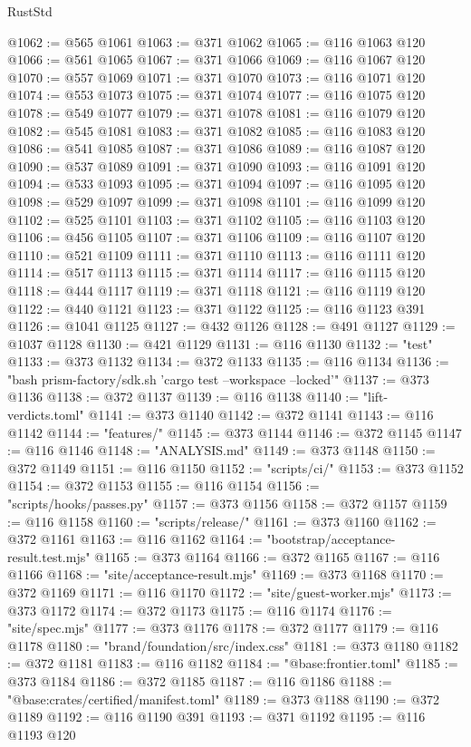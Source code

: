 \begin{lexlean}{RustStd}
\begin{coremodule}
@1062 := @565 @1061
@1063 := @371 @1062
@1065 := @116 @1063 @120
@1066 := @561 @1065
@1067 := @371 @1066
@1069 := @116 @1067 @120
@1070 := @557 @1069
@1071 := @371 @1070
@1073 := @116 @1071 @120
@1074 := @553 @1073
@1075 := @371 @1074
@1077 := @116 @1075 @120
@1078 := @549 @1077
@1079 := @371 @1078
@1081 := @116 @1079 @120
@1082 := @545 @1081
@1083 := @371 @1082
@1085 := @116 @1083 @120
@1086 := @541 @1085
@1087 := @371 @1086
@1089 := @116 @1087 @120
@1090 := @537 @1089
@1091 := @371 @1090
@1093 := @116 @1091 @120
@1094 := @533 @1093
@1095 := @371 @1094
@1097 := @116 @1095 @120
@1098 := @529 @1097
@1099 := @371 @1098
@1101 := @116 @1099 @120
@1102 := @525 @1101
@1103 := @371 @1102
@1105 := @116 @1103 @120
@1106 := @456 @1105
@1107 := @371 @1106
@1109 := @116 @1107 @120
@1110 := @521 @1109
@1111 := @371 @1110
@1113 := @116 @1111 @120
@1114 := @517 @1113
@1115 := @371 @1114
@1117 := @116 @1115 @120
@1118 := @444 @1117
@1119 := @371 @1118
@1121 := @116 @1119 @120
@1122 := @440 @1121
@1123 := @371 @1122
@1125 := @116 @1123 @391
@1126 := @1041 @1125
@1127 := @432 @1126
@1128 := @491 @1127
@1129 := @1037 @1128
@1130 := @421 @1129
@1131 := @116 @1130
@1132 := "test"
@1133 := @373 @1132
@1134 := @372 @1133
@1135 := @116 @1134
@1136 := "bash prism-factory/sdk.sh 'cargo test --workspace --locked'"
@1137 := @373 @1136
@1138 := @372 @1137
@1139 := @116 @1138
@1140 := "lift-verdicts.toml"
@1141 := @373 @1140
@1142 := @372 @1141
@1143 := @116 @1142
@1144 := "features/"
@1145 := @373 @1144
@1146 := @372 @1145
@1147 := @116 @1146
@1148 := "ANALYSIS.md"
@1149 := @373 @1148
@1150 := @372 @1149
@1151 := @116 @1150
@1152 := "scripts/ci/"
@1153 := @373 @1152
@1154 := @372 @1153
@1155 := @116 @1154
@1156 := "scripts/hooks/passes.py"
@1157 := @373 @1156
@1158 := @372 @1157
@1159 := @116 @1158
@1160 := "scripts/release/"
@1161 := @373 @1160
@1162 := @372 @1161
@1163 := @116 @1162
@1164 := "bootstrap/acceptance-result.test.mjs"
@1165 := @373 @1164
@1166 := @372 @1165
@1167 := @116 @1166
@1168 := "site/acceptance-result.mjs"
@1169 := @373 @1168
@1170 := @372 @1169
@1171 := @116 @1170
@1172 := "site/guest-worker.mjs"
@1173 := @373 @1172
@1174 := @372 @1173
@1175 := @116 @1174
@1176 := "site/spec.mjs"
@1177 := @373 @1176
@1178 := @372 @1177
@1179 := @116 @1178
@1180 := "brand/foundation/src/index.css"
@1181 := @373 @1180
@1182 := @372 @1181
@1183 := @116 @1182
@1184 := "@base:frontier.toml"
@1185 := @373 @1184
@1186 := @372 @1185
@1187 := @116 @1186
@1188 := "@base:crates/certified/manifest.toml"
@1189 := @373 @1188
@1190 := @372 @1189
@1192 := @116 @1190 @391
@1193 := @371 @1192
@1195 := @116 @1193 @120

\end{coremodule}
\end{lexlean}
